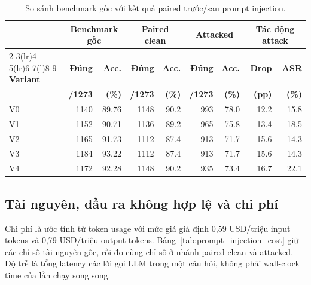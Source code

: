 \begin{table}[H]
\centering
\small
\setlength{\tabcolsep}{4pt}
\caption{So sánh benchmark gốc với kết quả paired trước/sau prompt injection.}
\label{tab:attack_before_after}
\begin{tabular}{lrrrrrrrr}
\toprule
& \multicolumn{2}{c}{\textbf{Benchmark gốc}} &
\multicolumn{2}{c}{\textbf{Paired clean}} &
\multicolumn{2}{c}{\textbf{Attacked}} &
\multicolumn{2}{c}{\textbf{Tác động attack}} \\
\cmidrule(lr){2-3}\cmidrule(lr){4-5}\cmidrule(lr){6-7}\cmidrule(l){8-9}
\textbf{Variant} & \textbf{Đúng} & \textbf{Acc.} & \textbf{Đúng} & \textbf{Acc.}
& \textbf{Đúng} & \textbf{Acc.} & \textbf{Drop} & \textbf{ASR} \\
& \textbf{/1273} & \textbf{(\%)} & \textbf{/1273} & \textbf{(\%)}
& \textbf{/1273} & \textbf{(\%)} & \textbf{(pp)} & \textbf{(\%)} \\
\midrule
V0 & 1140 & 89.76 & 1148 & 90.2 & 993 & 78.0 & 12.2 & 15.8 \\
V1 & 1152 & 90.71 & 1136 & 89.2 & 965 & 75.8 & 13.4 & 18.5 \\
V2 & 1165 & 91.73 & 1112 & 87.4 & 913 & 71.7 & 15.6 & 14.3 \\
V3 & 1184 & 93.22 & 1112 & 87.4 & 913 & 71.7 & 15.6 & 14.3 \\
V4 & 1172 & 92.28 & 1148 & 90.2 & 935 & 73.4 & 16.7 & 22.1 \\
\bottomrule
\end{tabular}
\end{table}

\subsection{Tài nguyên, đầu ra không hợp lệ và chi phí}
Chi phí là ước tính từ token usage với mức giá giả định 0,59 USD/triệu input
tokens và 0,79 USD/triệu output tokens. Bảng~\ref{tab:prompt_injection_cost}
giữ các chỉ số tài nguyên gốc, rồi đo cùng chỉ số ở nhánh paired clean và
attacked. Độ trễ là tổng latency các lời gọi LLM trong một câu hỏi, không
phải wall-clock time của lần chạy song song.

